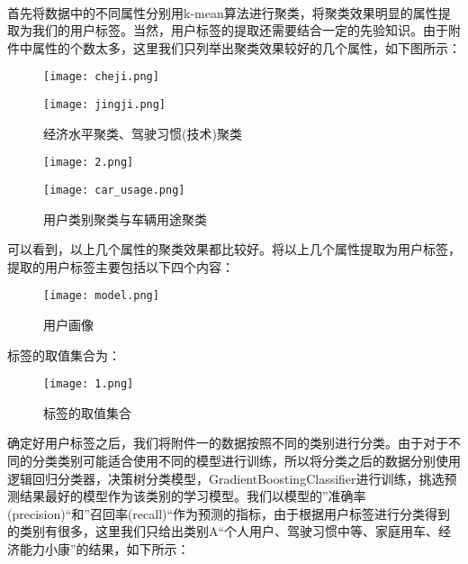 \documentclass[a4paper]{article}
\begin{document}
			\paragraph{}首先将数据中的不同属性分别用k-mean算法进行聚类，将聚类效果明显的属性提取为我们的用户标签。当然，用户标签的提取还需要结合一定的先验知识。由于附件中属性的个数太多，这里我们只列举出聚类效果较好的几个属性，如下图所示：
					\begin{figure}[htbp]
					\centering
					\begin{minipage}[t]{0.48\textwidth}
						\centering
						\texttt{[image: cheji.png]}
						\label{fig:label}
					\end{minipage}
					\begin{minipage}[t]{0.48\textwidth}
						\centering
						\texttt{[image: jingji.png]}
						\caption{经济水平聚类、驾驶习惯(技术)聚类}
					\end{minipage}
				\end{figure}
				\begin{figure}[htbp]
					\centering
					\begin{minipage}[t]{0.48\textwidth}
						\centering
						\texttt{[image: 2.png]}
						\label{fig:label}
					\end{minipage}
					\begin{minipage}[t]{0.48\textwidth}
						\centering
						\texttt{[image: car\_usage.png]}
						\caption{用户类别聚类与车辆用途聚类}
					\end{minipage}
				\end{figure}
			可以看到，以上几个属性的聚类效果都比较好。将以上几个属性提取为用户标签，提取的用户标签主要包括以下四个内容：\\
				\begin{figure}[H]	
					\centering
					\texttt{[image: model.png]}
					\caption{用户画像}
				\end{figure}
			标签的取值集合为：\\
				\begin{figure}[H]	
					\centering
					\texttt{[image: 1.png]}
					\caption{标签的取值集合}
				\end{figure}
			确定好用户标签之后，我们将附件一的数据按照不同的类别进行分类。由于对于不同的分类类别可能适合使用不同的模型进行训练，所以将分类之后的数据分别使用逻辑回归分类器，决策树分类模型，GradientBoostingClassifier进行训练，挑选预测结果最好的模型作为该类别的学习模型。我们以模型的”准确率(precision)“和”召回率(recall)“作为预测的指标，由于根据用户标签进行分类得到的类别有很多，这里我们只给出类别A“个人用户、驾驶习惯中等、家庭用车、经济能力小康”的结果，如下所示：
\end{document}
